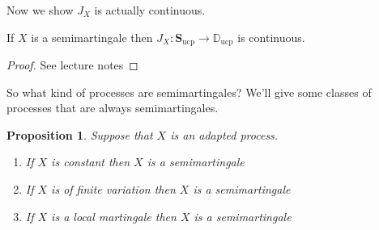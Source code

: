 \documentclass{scrreprt}
\theoremstyle{mydefn}
\newtheorem{prop}{Proposition}
\theoremstyle{remark}
\newcommand{\simpro}{\mathbf S}
\newcommand{\cadspace}{\mathbb D}
\newcommand{\ucp}{\text{ucp}}
\begin{document}
Now we show $J_X$ is actually continuous.

\begin{thm}
	If $X$ is a semimartingale then $J_X: \simpro_{\ucp} \to \cadspace_{\ucp}$ is continuous.
\end{thm}
\begin{proof}
	See lecture notes
\end{proof}
So what kind of processes are semimartingales? We'll give some classes of processes that are always semimartingales.

\begin{prop}
	\label{prop:semi-examples}
	Suppose that $X$ is an \cadlag{} adapted process.
	\begin{enumerate}
		\item If $X$ is constant then $X$ is a semimartingale
		\item If $X$ is of finite variation then $X$ is a semimartingale
		\item If $X$ is a local martingale then $X$ is a semimartingale
	\end{enumerate}
\end{prop}
\end{document}
